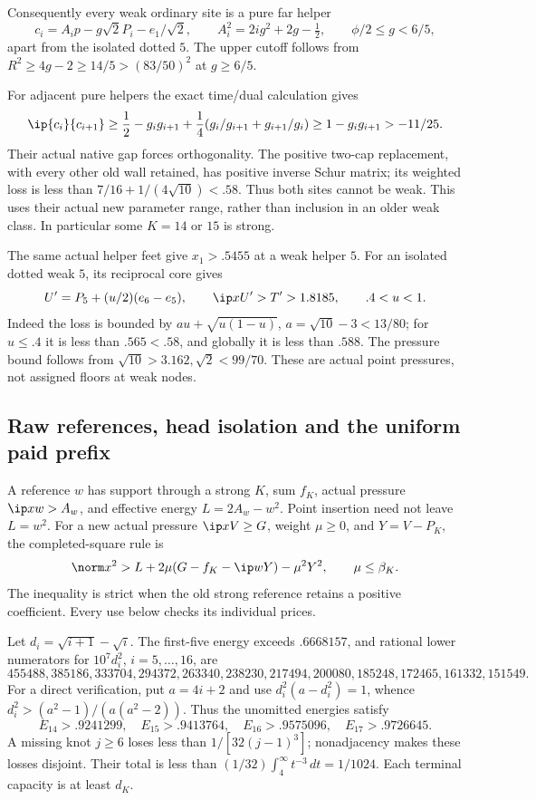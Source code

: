Consequently every weak ordinary site is a pure far helper
\[
 c_i=A_i p-g\sqrt2P_i-e_1/\sqrt2,\qquad
 A_i^2=2ig^2+2g-\tfrac12,\qquad
 \phi/2\leq g<6/5,
\]
apart from the isolated dotted \(5\).
The upper cutoff follows from
\(R^2\geq4g-2\geq14/5>(83/50)^2\) at \(g\geq6/5\).

For adjacent pure helpers the exact time/dual calculation gives
\[
 \ip{c_i}{c_{i+1}}
 \geq \frac12-g_i g_{i+1}
           +\frac14(g_i/g_{i+1}+g_{i+1}/g_i)
 \geq1-g_i g_{i+1}>-11/25.
\]
Their actual native gap forces orthogonality. The positive two-cap
replacement, with every other old wall retained, has positive
inverse Schur matrix; its weighted loss is less than
\(7/16+1/(4\sqrt{10})<.58\).
Thus both sites cannot be weak. This uses their actual new
parameter range, rather than inclusion in an older weak class.
In particular some \(K=14\) or \(15\) is strong.

The same actual helper feet give \(x_1>.5455\) at a weak
helper \(5\). For an isolated dotted weak \(5\), its reciprocal
core gives
\[
 U'=P_5+(u/2)(e_6-e_5),\qquad
 \ip x{U'}>T'>1.8185,\qquad .4<u<1.
\]
Indeed the loss is bounded by
\(a u+\sqrt{u(1-u)}\), \(a=\sqrt{10}-3<13/80\);
for \(u\leq.4\) it is less than \(.565<.58\), and globally
it is less than \(.588\).
The pressure bound follows from
\(\sqrt{10}>3.162,\sqrt2<99/70\).
These are actual point pressures, not assigned floors at weak nodes.

\subsection{Raw references, head isolation and the uniform paid prefix}
\label{app:B18references}
A reference \(w\) has support through a strong \(K\), sum \(f_K\),
actual pressure \(\ip xw>A_w\), and effective energy
\(L=2A_w-w^2\). Point insertion need not leave \(L=w^2\).
For a new actual pressure \(\ip xV\geq G\), weight \(\mu\geq0\),
and \(Y=V-P_K\), the completed-square rule is
\[
 \norm x^2>L+2\mu(G-f_K-\ip wY)-\mu^2Y^2,
 \qquad \mu\leq\beta_K .
\]
The inequality is strict when the old strong reference retains
a positive coefficient. Every use below checks its individual prices.

Let \(d_i=\sqrt{i+1}-\sqrt i\).
The first-five energy exceeds \(.6668157\), and rational lower
numerators for \(10^7d_i^2\), \(i=5,\ldots,16\), are
\[
 455488,385186,333704,294372,263340,238230,
 217494,200080,185248,172465,161332,151549.
\]
For a direct verification, put \(a=4i+2\) and use
\(d_i^2(a-d_i^2)=1\), whence
\(d_i^2>(a^2-1)/(a(a^2-2))\).
Thus the unomitted energies satisfy
\[
 E_{14}>.9241299,\quad E_{15}>.9413764,\quad
 E_{16}>.9575096,\quad E_{17}>.9726645.
\]
A missing knot \(j\geq6\) loses less than
\(1/[32(j-1)^3]\); nonadjacency makes these losses disjoint.
Their total is less than
\((1/32)\int_4^\infty t^{-3}\,dt=1/1024\).
Each terminal capacity is at least \(d_K\).

